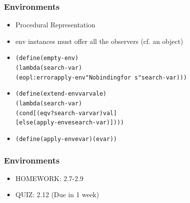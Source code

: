 \documentclass{beamer}
\newcommand{\quot}{\texttt{\textquotesingle{}}}
\begin{document}
\begin{frame}[fragile]
\frametitle{Environments}
\begin{scriptsize}
\begin{itemize}
\item<1-> Procedural Representation

\item<1-> env instances must offer all the observers (cf. an object)

\item<2->
\begin{alltt}
(define (empty-env)
  (lambda (search-var)
    (eopl:error \quot{}apply-env "No binding for ~s" search-var)))
\end{alltt}

\item<3->
\begin{alltt}
(define (extend-env var val e)
  (lambda (search-var)
    (cond [(eqv? search-var var) val]
          [else (apply-env e search-var)])))
\end{alltt}

\item<4->
\begin{alltt}
(define (apply-env e var) (e var))
\end{alltt}

\end{itemize}
\end{scriptsize}
\end{frame}

\begin{frame}[fragile]
\frametitle{Environments}
\begin{scriptsize}
\begin{itemize}
\item<1-> HOMEWORK: 2.7-2.9

\item<2-> QUIZ: 2.12 (Due in 1 week)

\end{itemize}
\end{scriptsize}
\end{frame}
\end{document}
